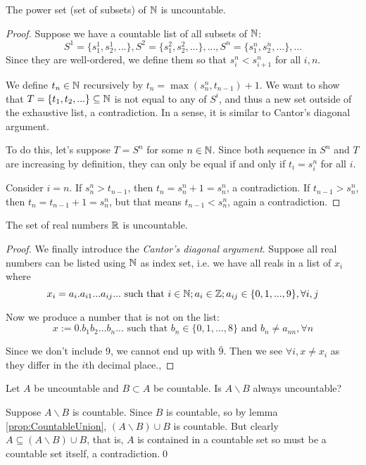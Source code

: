 \documentclass[11pt]{article}
\begin{document}
\begin{proposition}
  The power set (set of subsets) of \(\mathbb{N}\) is uncountable.
\end{proposition}
\begin{proof}
  Suppose we have a countable list of all subsets of \(\mathbb{N}\): \[S^1=\{s_1^1,s_2^1,...\},S^2=\{s_1^2,s_2^2,...\},...,S^n=\{s_1^n,s_2^n,...\},...\] Since they are well-ordered, we define them so that \(s_i^n<s_{i+1}^n\) for all \(i,n\).

  \vspace{5pt}We define \(t_n\in\mathbb{N}\) recursively by \(t_n=\max(s_n^n,t_{n-1})+1\). We want to show that \(T = \{t_1,t_2,...\} \subseteq \mathbb{N}\) is not equal to any of \(S^i\), and thus a new set outside of the exhaustive list, a contradiction. In a sense, it is similar to Cantor's diagonal argument.

  \vspace{5pt}To do this, let's suppose \(T=S^n\) for some \(n\in\mathbb{N}\). Since both sequence in \(S^n\) and \(T\) are increasing by definition, they can only be equal if and only if \(t_i=s_i^n\) for all \(i\). 

  \vspace{5pt}Consider \(i=n\). If \(s_n^n>t_{n-1}\), then \(t_n=s_n^n+1=s_n^n\), a contradiction. If \(t_{n-1}>s_n^n\), then \(t_n =t_{n-1}+1=s_n^n\), but that means \(t_{n-1}<s_n^n\), again a contradiction.
\end{proof}

\begin{theorem}[\(\R\) is uncountable]
  The set of real numbers \(\R\) is uncountable.
\end{theorem}
\begin{proof}
  We finally introduce the \emph{Cantor's diagonal argument}. Suppose all real numbers can be listed using \(\mathbb{N}\) as index set, i.e. we have all reals in a list of \(x_i\) where 
  \[x_{i}=a_{i}.a_{i1}...a_{ij}...\text{ such that } i \in \mathbb{N}; a_i \in \mathbb{Z}; a_{ij} \in \{0,1,...,9\}, \forall i,j\]

  Now we produce a number that is not on the list:
  \[x:=0.b_1b_2...b_n... \text{ such that } b_n \in \{0,1,...,8\} \text{ and } b_n \neq a_{nn}, \forall n\]

  Since we don't include 9, we cannot end up with \(\bar{9}\). Then we see \(\forall i, x \neq x_i\) as they differ in the \(i\)th decimal place.,
\end{proof}

\begin{exercise}
  Let \(A\) be uncountable and \(B\subset A\) be countable. Is \(A\backslash B\) always uncountable?
\end{exercise}
\begin{solution}
  Suppose \(A\backslash B\) is countable. Since \(B\) is countable, so by lemma \ref{prop:CountableUnion}, \((A\backslash B)\cup B\) is countable. But clearly \(A\subseteq (A\backslash B)\cup B\), that is, \(A\) is contained in a countable set so must be a countable set itself, a contradiction.\qed 
\end{solution}
\end{document}
